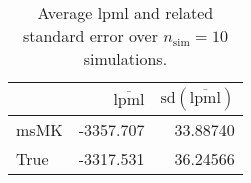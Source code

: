 \begin{table}[H]

\caption{Average lpml and related standard error over $n_{\text{sim}} = 10$ simulations.}
\centering
\begin{tabular}[t]{lrr}
\toprule
  & $\overbar{\text{lpml}}$ & $\text{sd}(\overbar{\text{lpml}})$\\
\midrule
msMK & -3357.707 & 33.88740\\
True & -3317.531 & 36.24566\\
\bottomrule
\end{tabular}
\end{table}